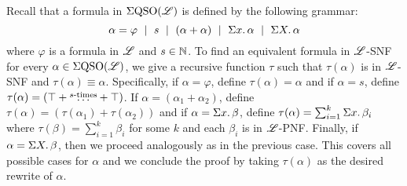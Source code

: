 Recall that a formula in $\Sigma{\rm QSO}(\mathscr{L})$ is defined by the following grammar:
\[
\alpha = \varphi \ \mid \ s \ \mid \ (\alpha + \alpha) \ \mid \ \Sigma{x}.\, \alpha \ \mid \ \Sigma{X}.\, \alpha
\]
where $\varphi$ is a formula in $\mathscr{L}$ and $s\in\mathbb{N}$. 
To find an equivalent formula in $\mathscr{L}$-SNF for every $\alpha \in \Sigma{\rm QSO}(\mathscr{L})$, we give a recursive function $\tau$ such that $\tau(\alpha)$ is in $\mathscr{L}$-SNF and $\tau(\alpha) \equiv \alpha$. 
Specifically, if $\alpha = \varphi$, define $\tau(\alpha) = \alpha$ and if $\alpha = s$, define $\tau(\alpha) = (\top + \overset{\text{$s$-times}}{\ldots} + \top)$.  If $\alpha = (\alpha_1 + \alpha_2)$, define $\tau(\alpha) = (\tau(\alpha_1) + \tau(\alpha_2))$ and if $\alpha = \Sigma{x}.\,\beta$, define $\tau(\alpha) = \sum_{i = 1}^{k}\Sigma{x}.\,\beta_i$ where $\tau(\beta) = \sum_{i = 1}^{k}\beta_i$ for some $k$ and each $\beta_i$ is in $\mathscr{L}$-PNF. Finally, if $\alpha = \Sigma{X}.\,\beta$, then we proceed analogously as in the previous case. This covers all possible cases for $\alpha$ and we conclude the proof by taking $\tau(\alpha)$ as the desired rewrite of $\alpha$.